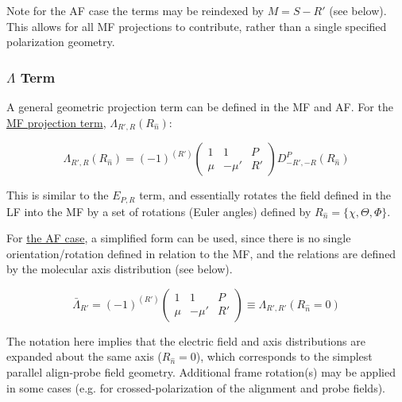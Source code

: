 \documentclass[10pt]{article}
\begin{document}
Note for the AF case the terms may be reindexed by $M=S-R'$ (see below). This allows for all MF projections to contribute, rather than a single specified polarization geometry.

\subsubsection{\texorpdfstring{\(\Lambda\)
Term}{\textbackslash{}Lambda term}}\label{lambda-term}

A general geometric projection term can be defined in the MF and AF.
For the \href{https://epsproc.readthedocs.io/en/latest/methods/geometric_method_dev_260220_090420_tidy.html\#/Lambda-Term}{MF
projection term}, \(\Lambda_{R',R}(R_{\hat{n}})\):

\begin{equation}
\Lambda_{R',R}(R_{\hat{n}})=(-1)^{(R')}\left(\begin{array}{ccc}
1 & 1 & P\\
\mu & -\mu' & R'
\end{array}\right)D_{-R',-R}^{P}(R_{\hat{n}})
\label{eq:lambda-func-defn-MF}
\end{equation}

This is similar to the $E_{P,R}$ term, and essentially rotates the field defined in the LF into
the MF by a set of rotations (Euler angles) defined by $R_{\hat{n}}=\{\chi,\Theta,\Phi\}$.

For
\href{https://epsproc.readthedocs.io/en/latest/methods/geometric_method_dev_pt3_AFBLM_090620_010920_dev_bk100920.html\#/beta_\%7BL,M\%7D\%5E\%7BAF\%7D-rewrite}{the
AF case}, a simplified form can be used, since there is no single
orientation/rotation defined in relation to the MF, and the relations are defined by the
molecular axis distribution (see below). 

\begin{equation}
\bar{\Lambda}_{R'}=(-1)^{(R')}\left(\begin{array}{ccc}
1 & 1 & P\\
\mu & -\mu' & R'
\end{array}\right)\equiv\Lambda_{R',R'}(R_{\hat{n}}=0)
\label{eq:lambda-func-defn-AF}
\end{equation}

The notation here implies that the electric field and axis distributions are expanded about the same axis ($R_{\hat{n}}=0$), which corresponds to the simplest parallel align-probe field geometry. Additional frame rotation(s) may be applied in some cases (e.g. for crossed-polarization of the alignment and probe fields).
\end{document}
